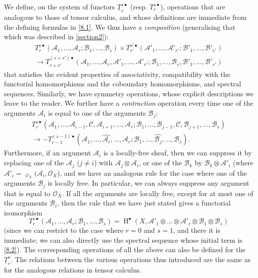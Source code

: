 \documentclass{article}
\theoremstyle{plain}
\theoremstyle{definition}
\newcommand{\sh}{\mathscr}
\DeclareMathOperator{\shHom}{\underline{Hom}}
\DeclareMathOperator{\HH}{H}
\newcommand{\oldpage}[1]{\marginpar{\footnotesize$\Big\vert$ \textit{p.~#1}}}
\begin{document}
We define, on the system of functors $\underline{T}_r^{s\bullet}$ (resp. $T_r^{s\bullet}$), operations that are analogous to those of tensor calculus, and whose definitions are immediate from the defining formulas in \cref{8.1}.
We thus have a \emph{composition} (generalising that which was described in \cref{section2}):
\[
\label{8.3}
  \begin{gathered}
    T_r^{s\bullet}(\sh{A}_1,\ldots,\sh{A}_r;\sh{B}_1,\ldots,\sh{B}_s)
    \times T_{r'}^{s'\bullet}(\sh{A}'_1,\ldots,\sh{A}'_{r'};\sh{B}'_1,\ldots,\sh{B}'_{s'})
  \\\to T_{r+r'}^{(s+s')\bullet}(\sh{A}_1,\ldots,\sh{A}_r,\sh{A}'_1,\ldots,\sh{A}'_{r'};\sh{B}_1,\ldots,\sh{B}_s,\sh{B}'_1,\ldots,\sh{B}'_{s'})
  \end{gathered}
\tag{8.3}
\]
that satisfies the evident properties of associativity, compatibility with the functorial homomorphisms and the coboundary homomorphisms, and spectral sequences.
Similarly, we have symmetry operations, whose explicit descriptions we leave to the reader.
We further have a \emph{contraction} operation every time one of the arguments $\sh{A}_i$
\oldpage{149-23}
is equal to one of the arguments $\sh{B}_j$:
\[
\label{8.4}
  \begin{gathered}
    T_r^{s\bullet}(\sh{A}_1,\ldots,\sh{A}_{i-1},\sh{C},\sh{A}_{i+1},\ldots,\sh{A}_r;\sh{B}_1,\ldots,\sh{B}_{j-1},\sh{C},\sh{B}_{j+1},\ldots,\sh{B}_s)
  \\\to -T_{r-1}^{(s-1)\bullet}(\sh{A}_1,\ldots,\widehat{\sh{A}_i},\ldots,\sh{A}_r;\sh{B}_1,\ldots,\widehat{\sh{B}_j},\ldots,\sh{B}_s).
  \end{gathered}
\tag{8.4}
\]
Furthermore, if an argument $\sh{A}_i$ is a locally-free sheaf, then we can suppress it by replacing one of the $\sh{A}_j$ ($j\neq i$) with $\sh{A}_j\otimes\sh{A}_i$, or one of the $\sh{B}_k$ by $\sh{B}_k\otimes\sh{A}'_i$ (where $\sh{A}'_i=\shHom_{\sh{O}_X}(\sh{A}_i,\sh{O}_X$), and we have an analogous rule for the case where one of the arguments $\sh{B}_j$ is locally free.
In particular, we can always suppress any argument that is equal to $\sh{O}_X$.
If all the arguments are locally free, except for at most one of the arguments $\sh{B}_i$, then the rule that we have just stated gives a functorial isomorphism
\[
\label{8.5}
  T_r^{s\bullet}(\sh{A}_1,\ldots,\sh{A}_r;\sh{B}_1,\ldots,\sh{B}_s)
  = \HH^\bullet(X,\sh{A}'_1\otimes\ldots\otimes\sh{A}'_{r}\otimes\sh{B}_1\otimes\sh{B}_s)
\tag{8.5}
\]
(since we can restrict to the case where $r=0$ and $s=1$, and there it is immediate; we can also directly use the spectral sequence whose initial term is \cref{8.2}).
The corresponding operations of all the above can also be defined for the $\underline{T}_r^s$.
The relations between the various operations thus introduced are the same as for the analogous relations in tensor calculus.
\end{document}
